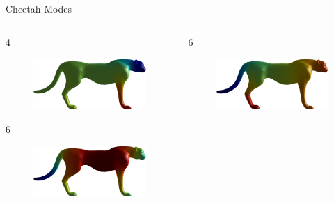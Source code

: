 \documentclass{beamer}
\begin{document}
\begin{frame}{Cheetah Modes}

\begin{columns}
\begin{column}[T]{5cm}
4
\begin{figure}[t]
    \includegraphics[width=\textwidth]{Harmonics/CheetahModes/4.png}
\end{figure}
6
\begin{figure}[t]
    \includegraphics[width=\textwidth]{Harmonics/CheetahModes/6.png}
\end{figure}
\end{column}
\begin{column}[T]{5cm}
6
\begin{figure}[t]
    \includegraphics[width=\textwidth]{Harmonics/CheetahModes/5.png}

\end{figure}
\end{column}
\end{columns}
\end{frame}
\end{document}
